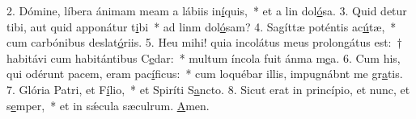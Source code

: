 2. Dómine, líbera ánimam meam a lábiis in\uline{í}quis,~* et a lin dol\uline{ó}sa.
3. Quid detur tibi, aut quid apponátur t\uline{i}bi~* ad linm dol\uline{ó}sam?
4. Sagíttæ poténtis ac\uline{ú}tæ,~* cum carbónibus deslat\uline{ó}riis.
5. Heu mihi! quia incolátus meus prolongátus est:~† habitávi cum habitántibus C\uline{e}dar:~* multum íncola fuit ánma m\uline{e}a.
6. Cum his, qui odérunt pacem, eram pac\uline{í}ficus:~* cum loquébar illis, impugnábnt me gr\uline{a}tis.
7. Glória Patri, et F\uline{í}lio,~* et Spiríti S\uline{a}ncto.
8. Sicut erat in princípio, et nunc, et s\uline{e}mper,~* et in sǽcula sæculrum. \uline{A}men.
